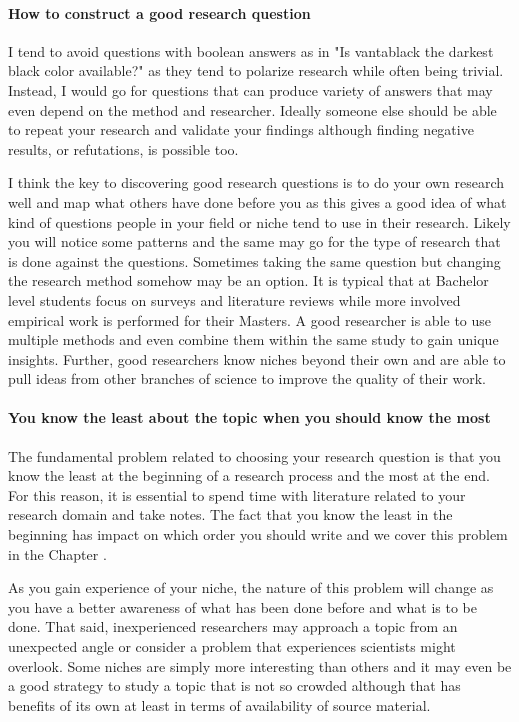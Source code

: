 \paragraph{How to construct a good research question}

I tend to avoid questions with boolean answers as in "Is vantablack the darkest black color available?" as they tend to polarize research while often being trivial.
Instead, I would go for questions that can produce variety of answers that may even depend on the method and researcher.
Ideally someone else should be able to repeat your research and validate your findings although finding negative results, or refutations, is possible too.

I think the key to discovering good research questions is to do your own research well and map what others have done before you as this gives a good idea of what kind of questions people in your field or niche tend to use in their research.
Likely you will notice some patterns and the same may go for the type of research that is done against the questions.
Sometimes taking the same question but changing the research method somehow may be an option.
It is typical that at Bachelor level students focus on surveys and literature reviews while more involved empirical work is performed for their Masters.
A good researcher is able to use multiple methods and even combine them within the same study to gain unique insights.
Further, good researchers know niches beyond their own and are able to pull ideas from other branches of science to improve the quality of their work.

\paragraph{You know the least about the topic when you should know the most}

The fundamental problem related to choosing your research question is that you know the least at the beginning of a research process and the most at the end.
For this reason, it is essential to spend time with literature related to your research domain and take notes.
The fact that you know the least in the beginning has impact on which order you should write and we cover this problem in the Chapter .

As you gain experience of your niche, the nature of this problem will change as you have a better awareness of what has been done before and what is to be done.
That said, inexperienced researchers may approach a topic from an unexpected angle or consider a problem that experiences scientists might overlook.
Some niches are simply more interesting than others and it may even be a good strategy to study a topic that is not so crowded although that has benefits of its own at least in terms of availability of source material.

